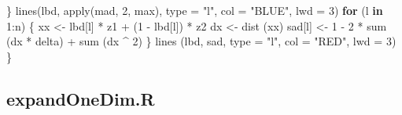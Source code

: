 \documentclass[
  12pt,
  letterpaper,
  DIV=11,
  numbers=noendperiod]{scrreprt}
\newenvironment{Shaded}{\begin{snugshade}}{\end{snugshade}}
\newcommand{\AttributeTok}[1]{\textcolor[rgb]{0.40,0.45,0.13}{#1}}
\newcommand{\ControlFlowTok}[1]{\textcolor[rgb]{0.00,0.23,0.31}{\textbf{#1}}}
\newcommand{\DecValTok}[1]{\textcolor[rgb]{0.68,0.00,0.00}{#1}}
\newcommand{\FunctionTok}[1]{\textcolor[rgb]{0.28,0.35,0.67}{#1}}
\newcommand{\NormalTok}[1]{\textcolor[rgb]{0.00,0.23,0.31}{#1}}
\newcommand{\OtherTok}[1]{\textcolor[rgb]{0.00,0.23,0.31}{#1}}
\newcommand{\SpecialCharTok}[1]{\textcolor[rgb]{0.37,0.37,0.37}{#1}}
\newcommand{\StringTok}[1]{\textcolor[rgb]{0.13,0.47,0.30}{#1}}
\theoremstyle{remark}
\begin{document}
\begin{Shaded}
\begin{Highlighting}[]
\NormalTok{  \}}
  \FunctionTok{lines}\NormalTok{(lbd,}
        \FunctionTok{apply}\NormalTok{(mad, }\DecValTok{2}\NormalTok{, max),}
        \AttributeTok{type =} \StringTok{"l"}\NormalTok{,}
        \AttributeTok{col =} \StringTok{"BLUE"}\NormalTok{,}
        \AttributeTok{lwd =} \DecValTok{3}\NormalTok{)}
  \ControlFlowTok{for}\NormalTok{ (l }\ControlFlowTok{in} \DecValTok{1}\SpecialCharTok{:}\NormalTok{n) \{}
\NormalTok{    xx }\OtherTok{\textless{}{-}}\NormalTok{ lbd[l] }\SpecialCharTok{*}\NormalTok{ z1 }\SpecialCharTok{+}\NormalTok{ (}\DecValTok{1} \SpecialCharTok{{-}}\NormalTok{ lbd[l]) }\SpecialCharTok{*}\NormalTok{ z2}
\NormalTok{    dx }\OtherTok{\textless{}{-}} \FunctionTok{dist}\NormalTok{ (xx)}
\NormalTok{    sad[l] }\OtherTok{\textless{}{-}} \DecValTok{1} \SpecialCharTok{{-}} \DecValTok{2} \SpecialCharTok{*} \FunctionTok{sum}\NormalTok{ (dx }\SpecialCharTok{*}\NormalTok{ delta) }\SpecialCharTok{+} \FunctionTok{sum}\NormalTok{ (dx }\SpecialCharTok{\^{}} \DecValTok{2}\NormalTok{)}
\NormalTok{  \}}
  \FunctionTok{lines}\NormalTok{ (lbd,}
\NormalTok{         sad,}
         \AttributeTok{type =} \StringTok{"l"}\NormalTok{,}
         \AttributeTok{col =} \StringTok{"RED"}\NormalTok{,}
         \AttributeTok{lwd =} \DecValTok{3}\NormalTok{)}
\NormalTok{\}}
\end{Highlighting}
\end{Shaded}

\subsection*{expandOneDim.R}\label{apcodeexpand}
\end{document}

